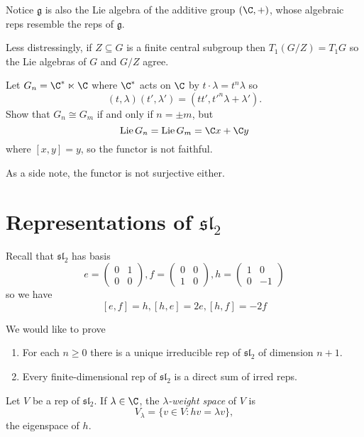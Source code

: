 \documentclass[a4paper]{article}
\newcommand*{\Lie}[1]{\mathfrak{#1}} %
\begin{document}
\begin{note}
  Notice \(\Lie g\) is also the Lie algebra of the additive group \((\C, +)\), whose algebraic reps resemble the reps of \(\Lie g\).
\end{note}

Less distressingly, if \(Z \subseteq G\) is a finite central subgroup then \(T_1(G/Z) = T_1G\) so the Lie algebras of \(G\) and \(G/Z\) agree.

\begin{ex}
  Let \(G_n = \C^* \ltimes \C\) where \(\C^*\) acts on \(\C\) by \(t \cdot \lambda = t^n \lambda\) so
  \[
    (t, \lambda) (t', \lambda') = (tt', t'^n \lambda + \lambda').
  \]
  Show that \(G_n \cong G_m\) if and only if \(n = \pm m\), but
  \[
    \operatorname{Lie} G_n = \operatorname{Lie} G_m = \C x + \C y
  \]
  where \([x, y] = y\), so the functor is not faithful.
\end{ex}
As a side note, the functor is not surjective either.

\section{Representations of \(\Lie{sl}_2\)}

Recall that \(\Lie{sl}_2\) has basis
\[
  e =
  \begin{pmatrix}
    0 & 1 \\
    0 & 0
  \end{pmatrix}
  , f =
  \begin{pmatrix}
    0 & 0 \\
    1 & 0
  \end{pmatrix}
  , h =
  \begin{pmatrix}
    1 & 0 \\
    0 & -1
  \end{pmatrix}
\]
so we have
\[
  [e, f] = h, [h, e] = 2e, [h, f] = -2f
\]
 
We would like to prove
\begin{theorem}\leavevmode
  \begin{enumerate}
  \item For each \(n \geq 0\) there is a unique irreducible rep of \(\Lie{sl}_2\) of dimension \(n + 1\).
  \item Every finite-dimensional rep of \(\Lie{sl}_2\) is a direct sum of irred reps.
  \end{enumerate}
\end{theorem}

\begin{definition}
  Let \(V\) be a rep of \(\Lie{sl}_2\). If \(\lambda \in \C\), the \emph{\(\lambda\)-weight space} of \(V\) is
  \[
    V_\lambda = \{v \in V: h v = \lambda v\},
  \]
  the eigenspace of \(h\).
\end{definition}
\end{document}
